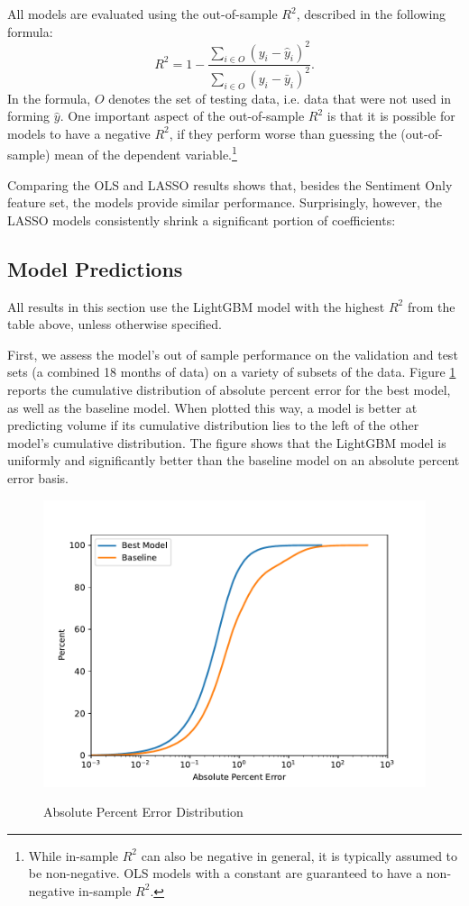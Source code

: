 \documentclass[12pt]{article}
\begin{document}
All models are evaluated using the out-of-sample $R^2$, described in the following formula:
\begin{equation}
    R^2 = 1 - \frac{\sum_{i\in O} (y_i - \hat{y}_i)^2}{\sum_{i\in O} (y_i - \bar{y}_i)^2}.
\end{equation}
In the formula, $O$ denotes the set of testing data, i.e. data that were not used in forming $\hat{y}$. One important aspect of the out-of-sample $R^2$ is that it is possible for models to have a negative $R^2$, if they perform worse than guessing the (out-of-sample) mean of the dependent variable.\footnote{While in-sample $R^2$ can also be negative in general, it is typically assumed to be non-negative. OLS models with a constant are guaranteed to have a non-negative in-sample $R^2$.}



Comparing the OLS and LASSO results shows that, besides the Sentiment Only feature set, the models provide similar performance. Surprisingly, however, the LASSO models consistently shrink a significant portion of coefficients: 

\subsection{Model Predictions}
All results in this section use the LightGBM model with the highest $R^2$ from the table above, unless otherwise specified.

First, we assess the model's out of sample performance on the validation and test sets (a combined 18 months of data) on a variety of subsets of the data. Figure \ref{fig:absolute_percent_error_distribution} reports the cumulative distribution of absolute percent error for the best model, as well as the baseline model. When plotted this way, a model is better at predicting volume if its cumulative distribution lies to the left of the other model's cumulative distribution. The figure shows that the LightGBM model is uniformly and significantly better than the baseline model on an absolute percent error basis.

\begin{figure}[H]
    \centering
    \caption{Absolute Percent Error Distribution}
    \includegraphics[width=0.75\linewidth]{../Output/absolute_percent_error_distribution.pdf}
    \label{fig:absolute_percent_error_distribution}
\end{figure}
\end{document}
